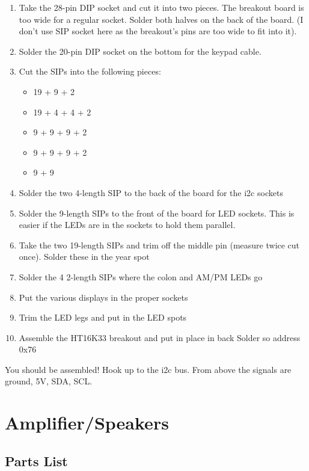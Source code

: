 \documentclass[11pt]{article}
\begin{document}
\begin{enumerate}
\item Take the 28-pin DIP socket and cut it into two pieces.
      The breakout board is too wide for a regular socket.
      Solder both halves on the back of the board.
      (I don't use SIP socket here as the breakout's pins are too
       wide to fit into it).
\item Solder the 20-pin DIP socket on the bottom for the
      keypad cable.
\item Cut the SIPs into the following pieces:
\begin{itemize}
\item 19 + 9 + 2
\item 19 + 4 + 4 + 2
\item 9 + 9 + 9 + 2
\item 9 + 9 + 9 + 2
\item 9 + 9
\end{itemize}
\item Solder the two 4-length SIP to the back of the board
      for the i2c sockets
\item Solder the 9-length SIPs to the front of the board for LED
      sockets.  This is easier if the LEDs are in the sockets to
      hold them parallel.
\item Take the two 19-length SIPs and trim off the middle pin
      (measure twice cut once).  Solder these in the year spot
\item Solder the 4 2-length SIPs where the colon and AM/PM LEDs go
\item Put the various displays in the proper sockets
\item Trim the LED legs and put in the LED spots
\item Assemble the HT16K33 breakout and put in place in back
      Solder so address 0x76
\end{enumerate}

You should be assembled!  Hook up to the i2c bus.  From above
the signals are ground, 5V, SDA, SCL.

\pagebreak
\section{Amplifier/Speakers}

\subsection{Parts List}
\end{document}
